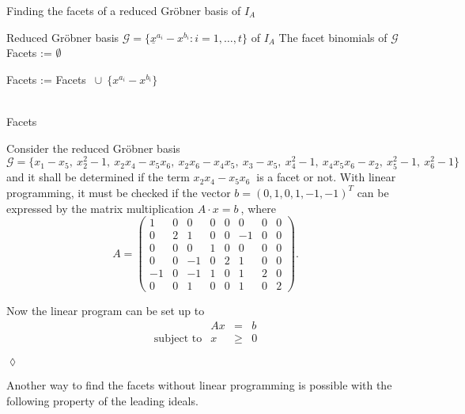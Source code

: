 \newpage

\begin{algorithm}
\caption{Finding the facets of a reduced Gröbner basis of $I_A$ \cite{tigers}}
\label{alg:facetsLP}
\label{facets}
\begin{algorithmic}[1]

\Input
Reduced Gröbner basis $ \mathcal{G} = \lbrace \underline{x}^{a_{i}} - {x}^{b_{i}} : i = 1,\dots,t  \rbrace $ of $I_A$
\Output The facet binomials of $\mathcal{G}$
\State Facets := $\emptyset$

\State Facets := Facets $~\cup~\{{x}^{a_{i}} - {x}^{b_{i}} \} $
\EndIf

\EndFor \\
\Return Facets
\end{algorithmic}
\end{algorithm}

\begin{env_example}\normalfont

Consider the reduced Gröbner basis \\
 $\mathcal{G} = \{x_1 - x_5,~x_{2}^{2}-1,~x_{2}x_{4}-x_{5}x_{6},~x_{2}x_{6}-x_{4}x_{5},~x_{3}-x_{5},~x_{4}^{2}-1,~x_{4}x_{5}x_{6}-x_{2},~x_{5}^{2}-1,~x_{6}^{2}-1  \}~$ and it shall be determined if the term $x_{2}x_{4}-x_{5}x_{6}~$ is a facet or not.
 With linear programming, it must be checked if the vector $b = {\left(0,1,0,1,-1,-1\right)}^{T}$ can be expressed by the matrix multiplication $A \cdot x = b~$, where \\
 \[
 A =
 \begin{pmatrix}
 1  & 0 & 0  & 0 & 0 & 0  & 0 & 0\\ 
 0  & 2 & 1  & 0 & 0 & -1 & 0 & 0\\  
 0  & 0 & 0  & 1 & 0 & 0  & 0 & 0\\ 
 0  & 0 & -1 & 0 & 2 & 1  & 0 & 0\\
 -1 & 0 & -1 & 1 & 0 & 1  & 2 & 0\\
 0  & 0 & 1  & 0 & 0 & 1  & 0 & 2
 \end{pmatrix} 
 .\] 
  
 Now the linear program can be set up to 
 \[
 	\begin{array}{lrcl}
 	\textrm{ }   & Ax    & =    & b   \\
 	\textrm{subject to}  & x     & \geq & 0
 			    
 	\end{array}
 \]
 

\begin{flushright}
$\lozenge$
\end{flushright}
\end{env_example}
\newpage 
Another way to find the facets without linear programming is possible with the following property of the leading ideals.

